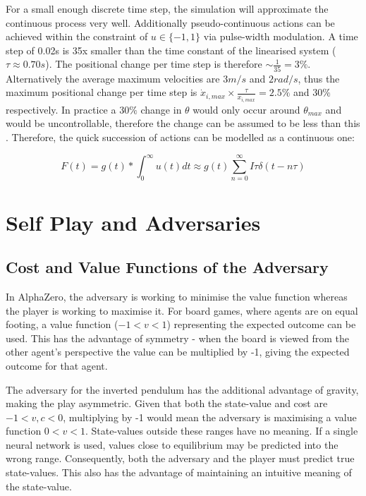 \documentclass[../main.tex]{subfiles}
\begin{document}
For a small enough discrete time step, the simulation will approximate the continuous process very well. Additionally pseudo-continuous actions can be achieved within the constraint of $u \in \{-1, 1\}$ via pulse-width modulation. A time step of 0.02s is 35x smaller than the time constant of the linearised system ($\tau \approx 0.70s$). The positional change per time step is therefore $\sim \frac{1}{35} = 3\%$. Alternatively the average maximum velocities are $3m/s$ and $2rad/s$, thus the maximum positional change per time step is $\dot{x}_{i, max} \times \frac{\tau}{x_{i, max}} = 2.5\%$ and $30\%$ respectively. In practice a $30\%$ change in $\theta$ would only occur around $\theta_{max}$ and would be uncontrollable, therefore the change can be assumed to be less than this . Therefore, the quick succession of actions can be modelled as a continuous one:

\begin{equation}
   F(t) = g(t) * \int^\infty_0 u(t) dt \approx g(t) \sum^\infty_{n=0} I\tau \delta(t-n\tau)
\end{equation} 

\section{Self Play and Adversaries}

\subsection{Cost and Value Functions of the Adversary}

In AlphaZero, the adversary is working to minimise the value function whereas the player is working to maximise it. For board games, where agents are on equal footing, a value function ($-1 < v < 1$) representing the expected outcome can be used. This has the advantage of symmetry - when the board is viewed from the other agent's perspective the value can be multiplied by -1, giving the expected outcome for that agent.

The adversary for the inverted pendulum has the additional advantage of gravity, making the play asymmetric. Given that both the state-value and cost are $-1 < v, c < 0$, multiplying by -1 would mean the adversary is maximising a value function $0 < v < 1$. State-values outside these ranges have no meaning. If a single neural network is used, values close to equilibrium may be predicted into the wrong range. Consequently, both the adversary and the player must predict true state-values. This also has the advantage of maintaining an intuitive meaning of the state-value.
\end{document}
